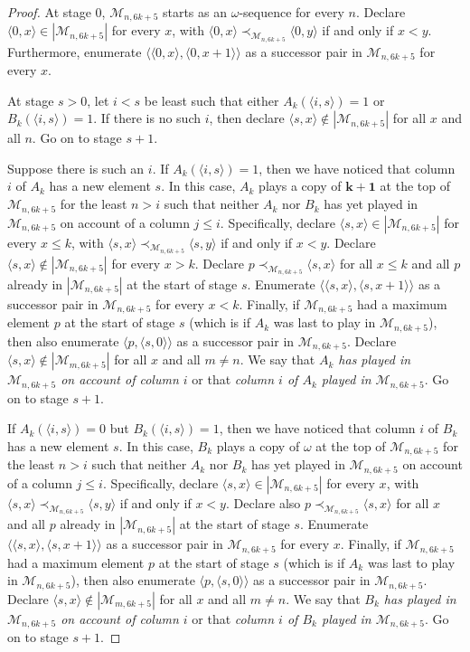 \documentclass[11pt,a4paper,reqno]{amsart}
\theoremstyle{definition}
\newcommand{\la}{\langle}
\newcommand{\ra}{\rangle}
\newcommand{\mc}[1]{\mathcal{#1}}
\begin{document}
\begin{proof}
At stage $0$, $\mc{M}_{n, 6k+5}$ starts as an $\omega$-sequence for every $n$.  Declare $\la 0, x \ra \in |\mc{M}_{n, 6k+5}|$ for every $x$, with $\la 0, x \ra \prec_{\mc{M}_{n, 6k+5}} \la 0, y \ra$ if and only if $x < y$.  Furthermore, enumerate $\la\la 0, x \ra, \la 0, x+1 \ra\ra$ as a successor pair in $\mc{M}_{n, 6k+5}$ for every $x$.

At stage $s > 0$, let $i < s$ be least such that either $A_k(\la i, s \ra) = 1$ or $B_k(\la i, s \ra) = 1$.  If there is no such $i$, then declare $\la s, x \ra \notin |\mc{M}_{n, 6k+5}|$ for all $x$ and all $n$.  Go on to stage $s+1$.

Suppose there is such an $i$.  If $A_k(\la i, s \ra) = 1$, then we have noticed that column $i$ of $A_k$ has a new element $s$.  In this case, $A_k$ plays a copy of $\bm{k+1}$ at the top of $\mc{M}_{n, 6k+5}$ for the least $n > i$ such that neither $A_k$ nor $B_k$ has yet played in $\mc{M}_{n, 6k+5}$ on account of a column $j \leq i$.  Specifically, declare $\la s, x \ra \in |\mc{M}_{n, 6k+5}|$ for every $x \leq k$, with $\la s, x \ra \prec_{\mc{M}_{n, 6k+5}} \la s, y \ra$ if and only if $x < y$.  Declare $\la s, x \ra \notin |\mc{M}_{n, 6k+5}|$ for every $x > k$.  Declare $p \prec_{\mc{M}_{n, 6k+5}} \la s, x \ra$ for all $x \leq k$ and all $p$ already in $|\mc{M}_{n, 6k+5}|$ at the start of stage $s$.  Enumerate $\la\la s, x \ra, \la s, x+1 \ra\ra$ as a successor pair in $\mc{M}_{n, 6k+5}$ for every $x < k$.  Finally, if $\mc{M}_{n, 6k+5}$ had a maximum element $p$ at the start of stage $s$ (which is if $A_k$ was last to play in $\mc{M}_{n, 6k+5}$), then also enumerate $\la p, \la s, 0 \ra\ra$ as a successor pair in $\mc{M}_{n, 6k+5}$.  Declare $\la s, x \ra \notin |\mc{M}_{m, 6k+5}|$ for all $x$ and all $m \neq n$.  We say that \emph{$A_k$ has played in $\mc{M}_{n, 6k+5}$ on account of column $i$} or that \emph{column $i$ of $A_k$ played in $\mc{M}_{n, 6k+5}$}.  Go on to stage $s+1$.

If $A_k(\la i, s \ra) = 0$ but $B_k(\la i, s \ra) = 1$, then we have noticed that column $i$ of $B_k$ has a new element $s$.  In this case, $B_k$ plays a copy of $\omega$ at the top of $\mc{M}_{n, 6k+5}$ for the least $n > i$ such that neither $A_k$ nor $B_k$ has yet played in $\mc{M}_{n, 6k+5}$ on account of a column $j \leq i$.  Specifically, declare $\la s, x \ra \in |\mc{M}_{n, 6k+5}|$ for every $x$, with $\la s, x \ra \prec_{\mc{M}_{n, 6k+5}} \la s, y \ra$ if and only if $x < y$.  Declare also $p \prec_{\mc{M}_{n, 6k+5}} \la s, x \ra$ for all $x$ and all $p$ already in $|\mc{M}_{n, 6k+5}|$ at the start of stage $s$.  Enumerate $\la\la s, x \ra, \la s, x+1 \ra\ra$ as a successor pair in $\mc{M}_{n, 6k+5}$ for every $x$.  Finally, if $\mc{M}_{n, 6k+5}$ had a maximum element $p$ at the start of stage $s$ (which is if $A_k$ was last to play in $\mc{M}_{n, 6k+5}$), then also enumerate $\la p, \la s, 0 \ra\ra$ as a successor pair in $\mc{M}_{n, 6k+5}$.  Declare $\la s, x \ra \notin |\mc{M}_{m, 6k+5}|$ for all $x$ and all $m \neq n$.  We say that \emph{$B_k$ has played in $\mc{M}_{n, 6k+5}$ on account of column $i$} or that \emph{column $i$ of $B_k$ played in $\mc{M}_{n, 6k+5}$}.  Go on to stage $s+1$.


\end{proof}
\end{document}
